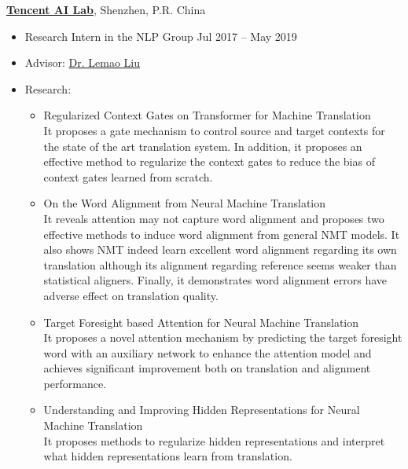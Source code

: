{\bf \href{https://ai.tencent.com/ailab/en/index/}{Tencent AI Lab}}, Shenzhen, P.R. China
\begin{itemize}
    \item[] Research Intern in the NLP Group \hfill Jul 2017 -- May 2019
    \item[] Advisor: \href{https://lemaoliu.github.io/}{Dr. Lemao Liu}
    \item[] Research:
    \begin{itemize}
        \item Regularized Context Gates on Transformer for Machine Translation~\cite{li-etal-2020-regularized} \\
        It proposes a gate mechanism to control source and target contexts for the state of the art translation system.
        In addition, it proposes an effective method to regularize the context gates to reduce the bias of context gates learned from scratch.
        \item On the Word Alignment from Neural Machine Translation~\cite{li-etal-2019-word} \\
        It reveals attention may not capture word alignment and proposes two effective methods to induce word alignment from general NMT models.
        It also shows NMT indeed learn excellent word alignment regarding its own translation although its alignment regarding reference seems weaker than statistical aligners.
        Finally, it demonstrates word alignment errors have adverse effect on translation quality.
        \item Target Foresight based Attention for Neural Machine Translation~\cite{li-etal-2018-target, li2021attending} \\
        It proposes a novel attention mechanism by predicting the target foresight word with an auxiliary network to enhance the attention model and achieves significant improvement both on translation and alignment performance.
        \item Understanding and Improving Hidden Representations for Neural Machine Translation~\cite{li-etal-2019-understanding-improving} \\
        It proposes methods to regularize hidden representations and interpret what hidden representations learn from translation.
    \end{itemize}
\end{itemize}

